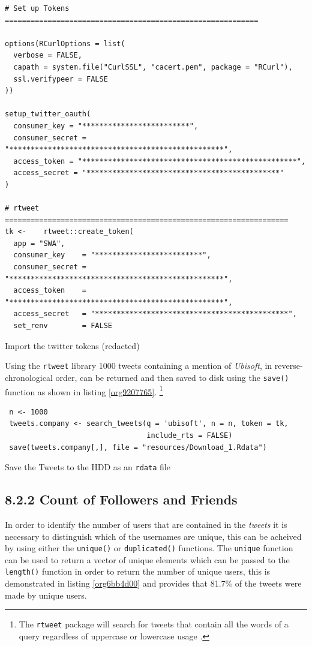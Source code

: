 \documentclass[11pt]{article}
\begin{document}
\begin{listing}[htbp]
\begin{verbatim}
# Set up Tokens ===========================================================

options(RCurlOptions = list(
  verbose = FALSE,
  capath = system.file("CurlSSL", "cacert.pem", package = "RCurl"),
  ssl.verifypeer = FALSE
))

setup_twitter_oauth(
  consumer_key = "*************************",
  consumer_secret = "**************************************************",
  access_token = "**************************************************",
  access_secret = "*********************************************"
)

# rtweet ==================================================================
tk <-    rtweet::create_token(
  app = "SWA",
  consumer_key    = "*************************",
  consumer_secret = "**************************************************",
  access_token    = "**************************************************",
  access_secret   = "*********************************************",
  set_renv        = FALSE
\end{verbatim}
\caption{\label{org7cf6aa4}Import the twitter tokens (redacted)}
\end{listing}

Using the \texttt{rtweet} library 1000 tweets containing a mention of \emph{Ubisoft}, in
reverse-chronological order, can be returned and then saved to disk using the
\texttt{save()} function as shown in listing \ref{org9207765}. \footnote{The \texttt{rtweet} package will search for tweets that contain all the words of a query
regardless of uppercase or lowercase usage \cite{kearney2019}.}

\begin{listing}[htbp]
\begin{verbatim}
 n <- 1000
 tweets.company <- search_tweets(q = 'ubisoft', n = n, token = tk,
                                 include_rts = FALSE)
 save(tweets.company[,], file = "resources/Download_1.Rdata")
\end{verbatim}
\caption{\label{org9207765}Save the Tweets to the HDD as an \texttt{rdata} file}
\end{listing}

\subsection{8.2.2 Count of Followers and Friends}
\label{sec:orgb8aafa8}
In order to identify the number of users that are contained in the \emph{tweets} it
is necessary to distinguish which of the usernames are unique, this can be
acheived by using either the \texttt{unique()} or \texttt{duplicated()} functions. The
\texttt{unique} function can be used to return a vector of unique elements which can be
passed to the \texttt{length()} function in order to return the number of unique users,
this is demonstrated in listing \ref{org6bb4d00} and provides that 81.7\% of the tweets were
made by unique users.
\end{document}

